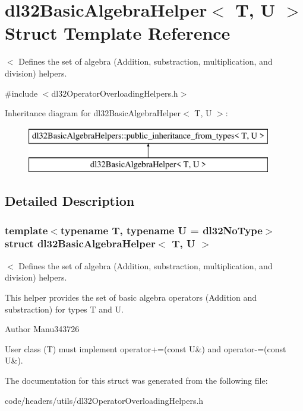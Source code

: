 \hypertarget{structdl32_basic_algebra_helper}{\section{dl32\-Basic\-Algebra\-Helper$<$ T, U $>$ Struct Template Reference}
\label{structdl32_basic_algebra_helper}
}


$<$ Defines the set of algebra (Addition, substraction, multiplication, and division) helpers.  




{\ttfamily \#include $<$dl32\-Operator\-Overloading\-Helpers.\-h$>$}

Inheritance diagram for dl32\-Basic\-Algebra\-Helper$<$ T, U $>$\-:\begin{figure}[H]
\begin{center}
\leavevmode
\includegraphics[height=2.000000cm]{structdl32_basic_algebra_helper}
\end{center}
\end{figure}


\subsection{Detailed Description}
\subsubsection*{template$<$typename T, typename U = dl32\-No\-Type$>$struct dl32\-Basic\-Algebra\-Helper$<$ T, U $>$}

$<$ Defines the set of algebra (Addition, substraction, multiplication, and division) helpers. 

This helper provides the set of basic algebra operators (Addition and substraction) for types T and U.

\begin{DoxyAuthor}{Author}
Manu343726
\end{DoxyAuthor}
User class (T) must implement operator+=(const U\&) and operator-\/=(const U\&). 

The documentation for this struct was generated from the following file\-:\begin{DoxyCompactItemize}
\item 
code/headers/utils/dl32\-Operator\-Overloading\-Helpers.\-h\end{DoxyCompactItemize}

